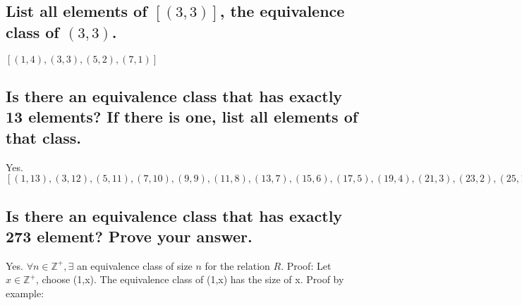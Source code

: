 \documentclass[10pt, letterpaper, titlepage]{article}
\newcommand{\0}{\varnothing}
\newcommand{\Z}{\mathbb{Z}}
\newcommand{\1}{\{ 1 \}}
\newcommand{\2}{\{ (1,1) \}}
\begin{document}
        \subsection{List all elements of $[(3,3)]$, the equivalence class of $(3,3)$.}
            $[(1, 4), (3, 3), (5, 2), (7, 1)]$

        \subsection{Is there an equivalence class that has exactly 13 elements? If there is one, list all elements of that class.}
            Yes.
            $[(1, 13), (3, 12), (5, 11), (7, 10), (9, 9), (11, 8), (13, 7), (15, 6), (17, 5), (19, 4), (21, 3), (23, 2), (25, 1)]$

        \subsection{Is there an equivalence class that has exactly 273 element? Prove your answer.}
            Yes.
            $\forall n \in\Z^+, \exists$ an equivalence class of size $n$ for the relation $R$.
            Proof:
            Let $x \in \Z^+$, choose (1,x).
            The equivalence class of (1,x) has the size of x.
            Proof by example:
\end{document}
